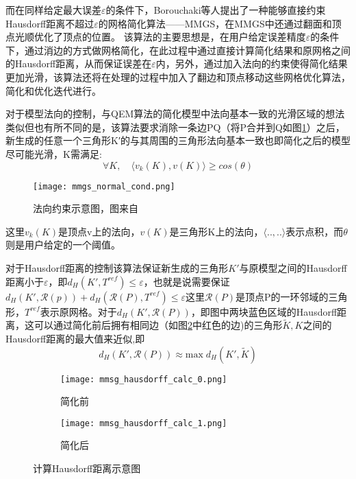 而在同样给定最大误差$\varepsilon$的条件下，Borouchaki等人提出了一种能够直接约束Hausdorff距离不超过$\varepsilon$的网格简化算法——MMGS\cite{mmgs}，在MMGS中还通过翻面和顶点光顺优化了顶点的位置。
该算法的主要思想是，在用户给定误差精度$\varepsilon$的条件下，通过消边的方式做网格简化，在此过程中通过直接计算简化结果和原网格之间的Hausdorff距离，从而保证误差在$\varepsilon$内，另外，通过加入法向的约束使得简化结果更加光滑，该算法还将在处理的过程中加入了翻边和顶点移动这些网格优化算法，简化和优化迭代进行。\par
对于模型法向的控制，与QEM算法的简化模型中法向基本一致的光滑区域的想法类似但也有所不同的是，该算法要求消除一条边PQ（将P合并到Q如图\ref{fig:mmgs-normal-cond}）之后，新生成的任意一个三角形K′的与其周围的三角形法向基本一致也即简化之后的模型尽可能光滑，K需满足:
\begin{equation}
  \forall K, \quad \langle v_k (K), v(K) \rangle \ge cos(\theta)
\end{equation}
\begin{figure}[htbp]
    \centering
    \texttt{[image: mmgs\_normal\_cond.png]}
    \caption[法向约束]{法向约束示意图，图来自\cite{mmgs}}
    \label{fig:mmgs-normal-cond}
\end{figure}
这里$v_k(K)$是顶点v上的法向，$v(K)$是三角形K上的法向，$\langle ..,.. \rangle$表示点积，而$\theta$则是用户给定的一个阈值。\par
对于Hausdorff距离的控制该算法保证新生成的三角形$K'$与原模型之间的Hausdorff距离小于$\varepsilon$，即$d_H(K',T^{ref})\le\varepsilon$，也就是说需要保证$d_H(K',\mathcal{R}(p))+d_H(\mathcal{R}(P),T^{ref}) \le \varepsilon$这里$\mathcal{R}(P)$是顶点P的一环邻域的三角形，$T^{ref}$表示原网格。对于$d_H(K',\mathcal{R}(P))$，即图中两块蓝色区域的Hausdorff距离，这可以通过简化前后拥有相同边（如图\ref{fig:mmgs-calc-haus}中红色的边)的三角形$\widetilde{K},K$之间的Hausdorff距离的最大值来近似,即
\begin{equation}
  d_H(K', \mathcal{R}(P)) \approx \text{max} \; d_H(K',\widetilde{K})
\end{equation}
\begin{figure}[htbp]
  \centering
  \begin{subfigure}[b]{0.4\textwidth}
    \texttt{[image: mmsg\_hausdorff\_calc\_0.png]}
    \caption[input]{简化前}
    \end{subfigure}
    \begin{subfigure}[b]{0.4\textwidth}
      \texttt{[image: mmsg\_hausdorff\_calc\_1.png]}
      \caption[mls]{简化后}
    \end{subfigure}
    \caption[MMGS计算Hausdorff距离]{计算Hausdorff距离示意图}
    \label{fig:mmgs-calc-haus}
\end{figure}
